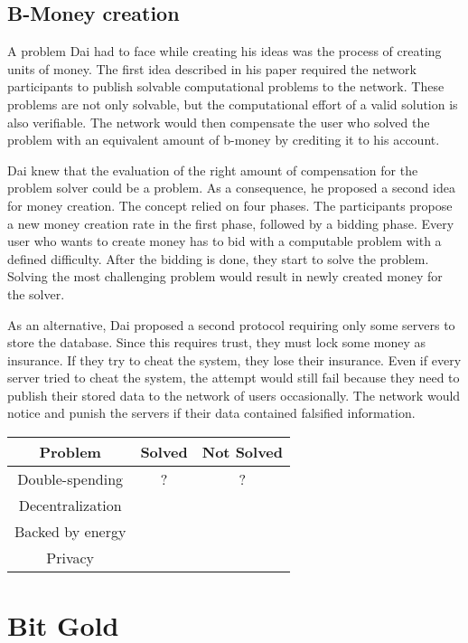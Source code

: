 \subsection{B-Money creation}
A problem Dai had to face while creating his ideas was the process of creating units of money.
The first idea described in his paper required the network participants to publish solvable computational problems to the network.
These problems are not only solvable, but the computational effort of a valid solution is also verifiable.
The network would then compensate the user who solved the problem with an equivalent amount of b-money by crediting it to his account.

Dai knew that the evaluation of the right amount of compensation for the problem solver could be a problem.
As a consequence, he proposed a second idea for money creation.
The concept relied on four phases.
The participants propose a new money creation rate in the first phase, followed by a bidding phase.
Every user who wants to create money has to bid with a computable problem with a defined difficulty.
After the bidding is done, they start to solve the problem.
Solving the most challenging problem would result in newly created money for the solver.

As an alternative, Dai proposed a second protocol requiring only some servers to store the database.
Since this requires trust, they must lock some money as insurance.
If they try to cheat the system, they lose their insurance.
Even if every server tried to cheat the system, the attempt would still fail because they need to publish their stored data to the network of users occasionally.
The network would notice and punish the servers if their data contained falsified information. \cite{dai1998}

\begin{center}
	\begin{tabular}{|c c c|} 
    \hline
	Problem & Solved & Not Solved \\ [0.5ex] 
	\hline
	Double-spending & ?  & ? \\ [0.5ex] 
	\hline
	Decentralization & \checkmark  & \\ [0.5ex] 
	\hline
	Backed by energy & \checkmark & \\ [0.5ex] 
	\hline
	Privacy & \checkmark &  \\ [0.5ex]
	\hline
	\end{tabular}
\end{center}

\section{Bit Gold}

